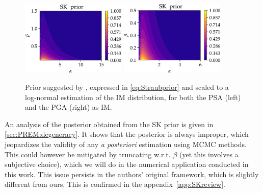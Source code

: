 \begin{figure}[h]
    \centering
    \includegraphics[width=5cm]{figures/PREM/SK_prior_PSA.pdf}\hspace*{0.5cm}
    \includegraphics[width=5cm]{figures/PREM/SK_prior_PGA.pdf}
    \caption{Prior suggested by \citet{straub_improved_2008},  expressed in \cref{eq:Straubprior} and scaled to a log-normal estimation of the IM distribution, for both the PSA (left) and the PGA (right) as IM.}
    \label{fig:Straubprior}
\end{figure}


An analysis of the posterior obtained from the SK prior is given in \cref{sec:PREM:degeneracy}. It shows that the posterior is always improper, which jeopardizes the validity of any \emph{a posteriori} estimation using MCMC methods. This could however be mitigated by truncating w.r.t. $\beta$ (yet this involves a subjective choice), which we will do in the numerical application conducted in this work. This issue persists in the authors' original framework, which is slightly different from ours. This is confirmed in the appendix~\ref{app:SKreview}.


